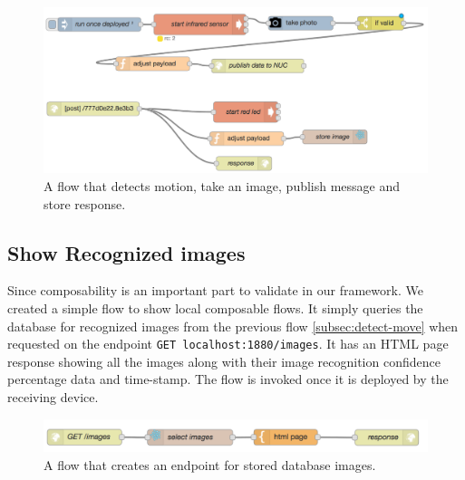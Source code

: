 \begin{figure}[H]
	\centering
	\includegraphics[scale=0.6]{images/flow-motion.png}
	\caption{A flow that detects motion, take an image, publish message and store response.}
	\label{fig:flow-motion}
\end{figure}


\subsection{Show Recognized images}\label{subsec:images}
Since composability is an important part to validate in our framework. We created a simple flow to show local composable flows. It simply queries the database for recognized images from the previous flow \ref{subsec:detect-move} when requested on the endpoint \verb|GET localhost:1880/images|. It has an HTML page response showing all the images along with their image recognition confidence percentage data and time-stamp. The flow is invoked once it is deployed by the receiving device.

\begin{figure}[H]
	\centering
	\includegraphics[scale=0.6]{images/flow-images.png}
	\caption{A flow that creates an endpoint for stored database images.}
	\label{fig:flow-image}
\end{figure}

